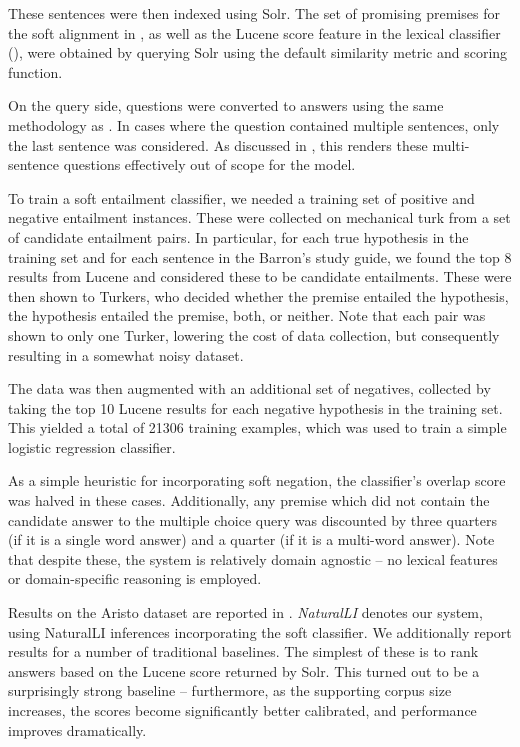 These sentences were then indexed using Solr.
The set of promising premises for the soft alignment in , as well as
  the Lucene score feature in the lexical classifier (),
  were obtained by querying Solr using the default similarity metric and scoring function.

On the query side, questions were converted to answers using the same methodology as
  .
In cases where the question contained multiple sentences, only the last sentence
  was considered.
As discussed in , 
  this renders these multi-sentence questions effectively out of scope for the model.

%
%
To train a soft entailment classifier, we needed a training set of positive
  and negative entailment instances.
These were collected on mechanical turk from a set of candidate entailment pairs.
In particular, for each true hypothesis in the training set and for each sentence
  in the Barron's study guide, we found the top 8 results from Lucene and considered
  these to be candidate entailments.
These were then shown to Turkers, who decided whether the premise entailed the
  hypothesis, the hypothesis entailed the premise, both, or neither.
Note that each pair was shown to only one Turker, lowering the cost of
  data collection, but consequently resulting in a somewhat noisy dataset.

The data was then augmented with an additional set of negatives, collected by taking
  the top 10 Lucene results for each negative hypothesis in the training set.
This yielded a total of \num{21306} training examples, which was used to train
  a simple logistic regression classifier.

As a simple heuristic for incorporating soft negation, the classifier's overlap
  score was halved in these cases.
Additionally, any premise which did not contain the candidate answer to the
  multiple choice query was discounted by three quarters (if it is a single
  word answer) and a quarter (if it is a multi-word answer).
Note that despite these, the system is relatively domain agnostic -- no
  lexical features or domain-specific reasoning is employed.

%
%
Results on the Aristo dataset are reported in .
\textit{NaturalLI} denotes our system, using NaturalLI inferences incorporating
  the soft classifier.
%
We additionally report results for a number of traditional baselines.
The simplest of these is to rank answers based on the Lucene score returned by
  Solr.
This turned out to be a surprisingly strong baseline -- furthermore, as the supporting
  corpus size increases, the scores become significantly better calibrated, and
  performance improves dramatically.

